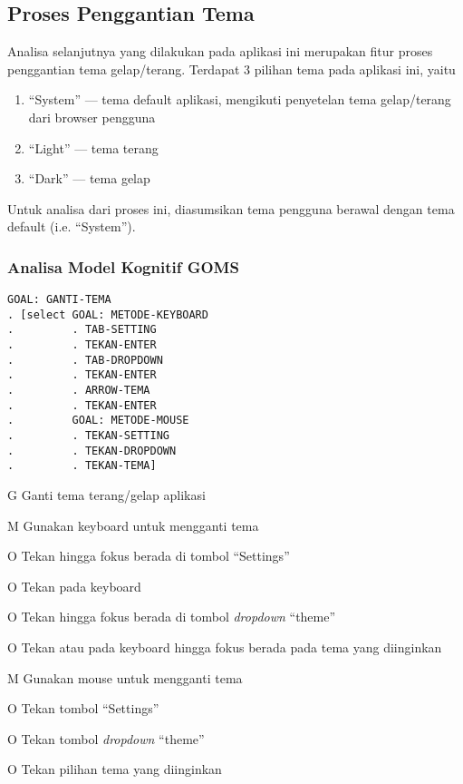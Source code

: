 \clearpage
\subsection{Proses Penggantian Tema}
Analisa selanjutnya yang dilakukan pada aplikasi ini merupakan fitur
proses penggantian tema gelap/terang. Terdapat 3 pilihan tema pada
aplikasi ini, yaitu
\begin{enumerate}
  \item ``System'' --- tema default aplikasi, mengikuti penyetelan
    tema gelap/terang dari browser pengguna
  \item ``Light'' --- tema terang
  \item ``Dark'' --- tema gelap
\end{enumerate}
Untuk analisa dari proses ini, diasumsikan tema pengguna berawal
dengan tema default (i.e. ``System'').

\subsubsection{Analisa Model Kognitif GOMS}

\begin{verbatim}
GOAL: GANTI-TEMA
. [select GOAL: METODE-KEYBOARD
.         . TAB-SETTING
.         . TEKAN-ENTER
.         . TAB-DROPDOWN
.         . TEKAN-ENTER
.         . ARROW-TEMA
.         . TEKAN-ENTER
.         GOAL: METODE-MOUSE
.         . TEKAN-SETTING
.         . TEKAN-DROPDOWN
.         . TEKAN-TEMA]
\end{verbatim}

\begin{chtbl}
  \begin{gomstbl}
    G{
      Ganti tema terang/gelap aplikasi
    }

    M{
      Gunakan keyboard untuk mengganti tema
    }

    O{
      Tekan \Tab hingga fokus berada di tombol ``Settings''
    }

    O{
      Tekan \Enter pada keyboard
    }

    O{
      Tekan \Tab hingga fokus berada di tombol \textit{dropdown} ``theme''
    }

    O{
      Tekan \UArrow atau \DArrow pada keyboard hingga fokus berada
      pada tema yang diinginkan
    }

    M{
      Gunakan mouse untuk mengganti tema
    }

    O{
      Tekan tombol ``Settings''
    }

    O{
      Tekan tombol \textit{dropdown} ``theme''
    }

    O{
      Tekan pilihan tema yang diinginkan
    }
  \end{gomstbl}
\end{chtbl}


